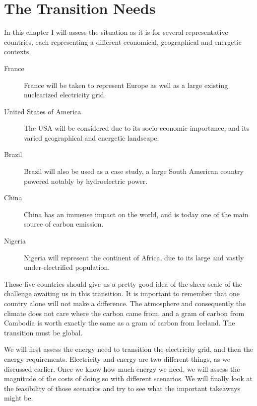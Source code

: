 \setchapterpreamble[u]{\margintoc}
\chapter{The Transition Needs}

In this chapter I will assess the situation as it is for several representative countries, each representing a different economical, geographical and energetic contexts.

\begin{description}
	\item[France] France will be taken to represent Europe as well as a large existing nuclearized electricity grid.
	\item[United States of America] The USA will be considered due to its socio-economic importance, and its varied geographical and energetic landscape.
	\item[Brazil] Brazil will also be used as a case study, a large South American country powered notably by hydroelectric power.
	\item[China] China has an immense impact on the world, and is today one of the main source of carbon emission.
	\item[Nigeria] Nigeria will represent the continent of Africa, due to its large and vastly under-electrified population.
\end{description}

Those five countries should give us a pretty good idea of the sheer scale of the challenge awaiting us in this transition. It is important to remember that one country alone will not make a difference. The atmosphere and consequently the climate does not care where the carbon came from, and a gram of carbon from Cambodia is worth exactly the same as a gram of carbon from Iceland. The transition must be global.


We will first assess the energy need to transition the electricity grid, and then the energy requirements. Electricity and energy are two different things, as we discussed earlier. Once we know how much energy we need, we will assess the magnitude of the costs of doing so with different scenarios. We will finally look at the feasibility of those scenarios and try to see what the important takeaways might be.


